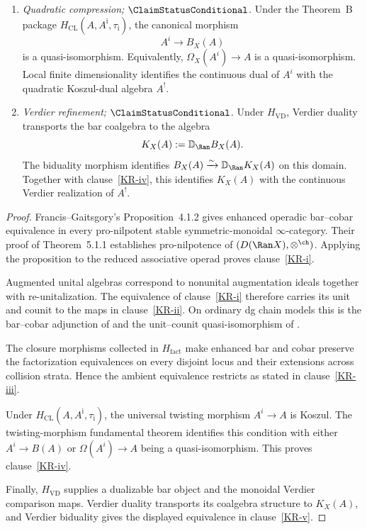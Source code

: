 \begin{theorem}
\begin{enumerate}[label=\textup{(\roman*)}]
\[\]
\item \label{KR-iv} \emph{Quadratic compression;
$\ClaimStatusConditional$.}
Under the Theorem~B package
$H_{\mathrm{CL}}(A,A^{\mathrm i},\tau_{\mathrm i})$, the canonical morphism
\[
 A^i\longrightarrow B_X(A)
\]
is a quasi-isomorphism.  Equivalently,
$\Omega_X(A^i)\to A$ is a quasi-isomorphism.  Local finite
dimensionality identifies the continuous dual of $A^i$ with the
quadratic Koszul-dual algebra $A^!$.
\item \label{KR-v} \emph{Verdier refinement;
$\ClaimStatusConditional$.}
Under $H_{\mathrm{VD}}$, Verdier duality transports the bar coalgebra
to the algebra
\[
 K_X(A):=\mathbb D_{\Ran}B_X(A).
\]
The biduality morphism identifies
$B_X(A)\xrightarrow{\sim}\mathbb D_{\Ran}K_X(A)$ on this domain.
Together with clause~\ref{KR-iv}, this identifies $K_X(A)$ with the
continuous Verdier realization of $A^!$.
\end{enumerate}
\end{theorem}

\begin{proof}
Francis--Gaitsgory's Proposition~4.1.2 gives enhanced operadic
bar--cobar equivalence in every pro-nilpotent stable
symmetric-monoidal $\infty$-category.  Their proof of
Theorem~5.1.1 establishes pro-nilpotence of
$(D(\Ran X),\otimes^{\ch})$.  Applying the proposition to the reduced
associative operad proves clause~\ref{KR-i}.

Augmented unital algebras correspond to nonunital augmentation ideals
together with re-unitalization.  The equivalence of
clause~\ref{KR-i} therefore carries its unit and counit to the maps in
clause~\ref{KR-ii}.  On ordinary dg chain models this is the
bar--cobar adjunction of \cite[Theorem~2.2.9]{LV12} and the unit--counit
quasi-isomorphism of \cite[Corollary~2.3.4]{LV12}.

The closure morphisms collected in $H_{\mathrm{fact}}$ make enhanced
bar and cobar preserve the factorization equivalences on every
disjoint locus and their extensions across collision strata.  Hence
the ambient equivalence restricts as stated in clause~\ref{KR-iii}.

Under $H_{\mathrm{CL}}(A,A^{\mathrm i},\tau_{\mathrm i})$, the universal
twisting morphism $A^i\to A$ is Koszul.  The twisting-morphism fundamental theorem
\cite[Theorem~2.3.2]{LV12} identifies this condition with either
$A^i\to B(A)$ or $\Omega(A^i)\to A$ being a quasi-isomorphism.  This
proves clause~\ref{KR-iv}.

Finally, $H_{\mathrm{VD}}$ supplies a dualizable bar object and the
monoidal Verdier comparison maps.  Verdier duality transports its
coalgebra structure to $K_X(A)$, and Verdier biduality gives the
displayed equivalence in clause~\ref{KR-v}.
\end{proof}

